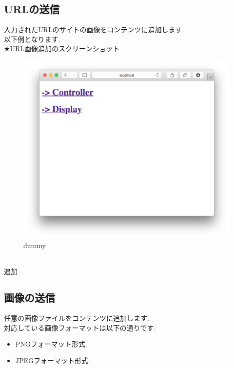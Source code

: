 \documentclass[a4paper,10pt,oneside]{jsbook}
\begin{document}
\subsection{URLの送信}
入力されたURLのサイトの画像をコンテンツに追加します.\\
以下例となります.\\
★URL画像追加のスクリーンショット
\begin{figure}[htbp]
	\begin{center}
		\includegraphics[width=11.5cm]{image/home.png}
	\end{center}
	\caption{dummy}
	\label{fig:home}
\end{figure}
\\追加



\subsection{画像の送信}
任意の画像ファイルをコンテンツに追加します.\\
対応している画像フォーマットは以下の通りです.\\

\begin{itemize}
\item PNGフォーマット形式.
\item JPEGフォーマット形式.
\end{itemize}
\end{document}
